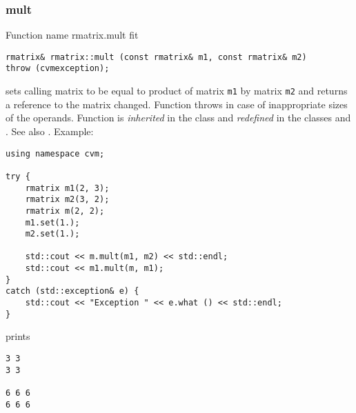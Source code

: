 \subsubsection{mult}
Function%
\pdfdest name {rmatrix.mult} fit
\begin{verbatim}
rmatrix& rmatrix::mult (const rmatrix& m1, const rmatrix& m2)
throw (cvmexception);
\end{verbatim}
sets  calling matrix to be equal to  product of  matrix
\verb"m1" by  matrix \verb"m2"
and returns a reference to
the matrix changed.
Function throws  
in case of inappropriate sizes of the operands.
Function is \emph{inherited} in the class 
and \emph{redefined} in the classes
 and
.
See also
.
Example:
\begin{Verbatim}
using namespace cvm;

try {
    rmatrix m1(2, 3);
    rmatrix m2(3, 2);
    rmatrix m(2, 2);
    m1.set(1.);
    m2.set(1.);

    std::cout << m.mult(m1, m2) << std::endl;
    std::cout << m1.mult(m, m1);
}
catch (std::exception& e) {
    std::cout << "Exception " << e.what () << std::endl;
}
\end{Verbatim}
prints
\begin{Verbatim}
3 3
3 3

6 6 6
6 6 6
\end{Verbatim}
\newpage



